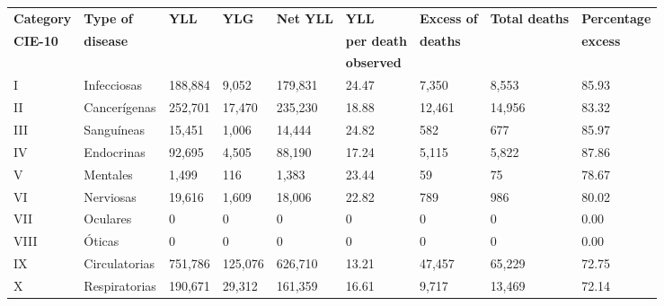 \begin{tabular}{lllllllll}
\midrule[1.5 pt]
\textbf{Category} & \textbf{Type of} &\textbf{YLL} & \textbf{YLG} & \textbf{Net YLL} & \textbf{YLL} & \textbf{Excess of} & \textbf{Total deaths} & \textbf{Percentage} \\
\textbf{CIE-10} & \textbf{disease} &  &  &  & \textbf{per death} & \textbf{deaths} & & \textbf{excess} \\
 &  &  &  &  & \textbf{observed} &  & &  \\
\midrule
I                      & Infecciosas      & 188,884      & 9,052              & 179,831            & 24.47             & 7,350                   & 8,553  & 85.93       \\
II                     & Cancerígenas     & 252,701      & 17,470             & 235,230            & 18.88             & 12,461                  & 14,956 & 83.32       \\
III                    & Sanguíneas       & 15,451       & 1,006              & 14,444             & 24.82             & 582                     & 677    & 85.97       \\
IV                     & Endocrinas       & 92,695       & 4,505              & 88,190             & 17.24             & 5,115                   & 5,822  & 87.86       \\
V                      & Mentales         & 1,499        & 116                & 1,383              & 23.44             & 59                      & 75     & 78.67       \\
VI                     & Nerviosas        & 19,616       & 1,609              & 18,006             & 22.82             & 789                     & 986    & 80.02       \\
VII                    & Oculares         & 0            & 0                  & 0                  & 0                 & 0                       & 0      & 0.00        \\
VIII                   & Óticas           & 0            & 0                  & 0                  & 0                 & 0                       & 0      & 0.00        \\
IX                     & Circulatorias    & 751,786      & 125,076            & 626,710            & 13.21             & 47,457                  & 65,229 & 72.75       \\
X                      & Respiratorias    & 190,671      & 29,312             & 161,359            & 16.61             & 9,717                   & 13,469 & 72.14       \\

\end{tabular}
